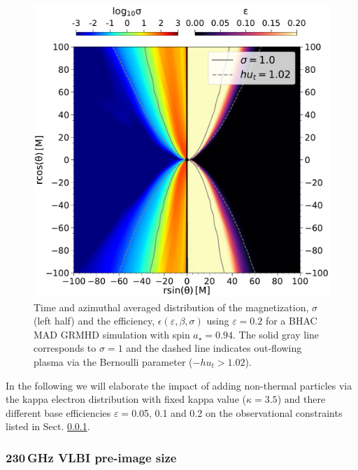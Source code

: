 \begin{figure}
  \centering
    \includegraphics[width=\columnwidth]{./figures/GRMHDphiavera0.94sigmaeta.pdf}
  \caption{Time and azimuthal averaged distribution of the magnetization, $\sigma$ (left half) and the efficiency, $\epsilon(\varepsilon,\beta,\sigma)$ using $\varepsilon=0.2 $ for a BHAC MAD GRMHD simulation with spin $a_{\star}=0.94$. The solid gray line corresponds to $\sigma=1$ and the dashed line indicates out-flowing plasma via the Bernoulli parameter ($-h u_{t}>1.02$).}
  \label{fig:varepsilon}
\end{figure}

In the following we will elaborate the impact of adding non-thermal particles via the kappa electron distribution with fixed kappa value ($\kappa=3.5$) and there different base efficiencies $\varepsilon=$0.05, 0.1 and 0.2 on the observational constraints listed in Sect. \ref{}.

\subsubsection{230\,GHz VLBI pre-image size}

